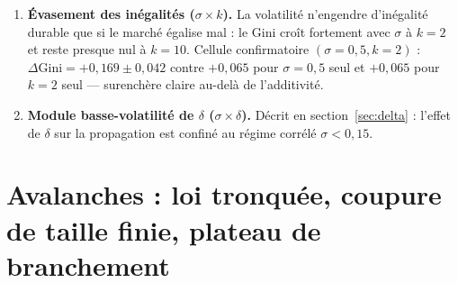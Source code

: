 \documentclass[11pt,a4paper]{article}
\begin{document}
\begin{enumerate}
\item \textbf{Évasement des inégalités ($\sigma\times k$).} La
  volatilité n'engendre d'inégalité durable que si le marché égalise
  mal : le Gini croît fortement avec $\sigma$ à $k=2$ et reste presque
  nul à $k=10$. Cellule confirmatoire $(\sigma{=}0{,}5,k{=}2)$ :
  $\Delta\mathrm{Gini}=+0{,}169\pm0{,}042$ contre $+0{,}065$ pour
  $\sigma=0{,}5$ seul et $+0{,}065$ pour $k=2$ seul — surenchère
  claire au-delà de l'additivité.
\item \textbf{Module basse-volatilité de $\delta$
  ($\sigma\times\delta$).} Décrit en section~\ref{sec:delta} : l'effet
  de $\delta$ sur la propagation est confiné au régime corrélé
  $\sigma<0{,}15$.
\end{enumerate}

\section{Avalanches : loi tronquée, coupure de taille finie, plateau de
branchement}
\label{sec:avalanches}
\end{document}
